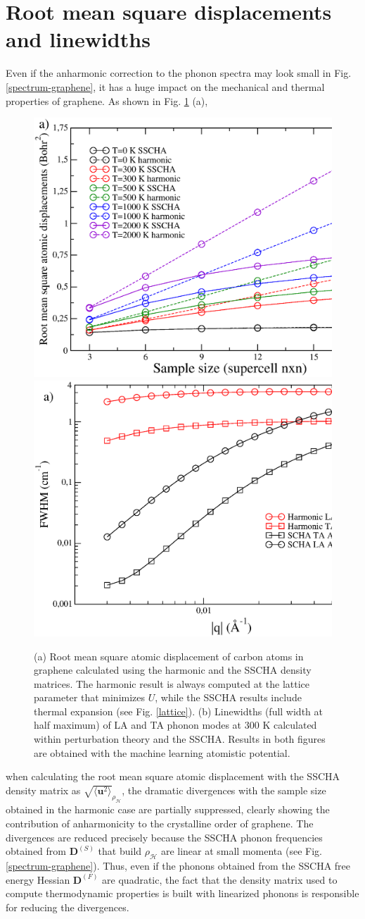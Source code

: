 \section{Root mean square displacements and linewidths}

Even if the anharmonic correction to the phonon spectra may look small in Fig. \ref{spectrum-graphene}, it has a 
huge impact on the mechanical and thermal properties of graphene. As shown in Fig. \ref{problems} (a), 
\begin{figure}[ht]
\includegraphics[width=0.49\linewidth]{Figures/rms.eps}
\includegraphics[width=0.49\linewidth]{Figures/lw-graphene.eps}
\caption[SSCHA root mean square atomic displacements and linewidths]{(a) Root mean square atomic displacement of 
	carbon atoms in graphene calculated using the harmonic and the SSCHA density matrices. The harmonic result 
	is always computed at the lattice parameter that minimizes $U$, while the SSCHA results include thermal 
	expansion (see Fig. \ref{lattice}). (b) Linewidths (full width at half maximum) of LA and TA phonon modes 
	at $300$ K calculated within perturbation theory and the SSCHA. Results in both figures are obtained with 
	the machine learning atomistic potential.}
\label{problems}
\end{figure}
when calculating the root mean square atomic displacement with the SSCHA density matrix as 
$\sqrt{\langle \mathbf{u}^2 \rangle}_{\rho_{\mathcal{H}}}$, the dramatic divergences with the sample size obtained 
in the harmonic case are partially suppressed, clearly showing the contribution of anharmonicity to the crystalline 
order of graphene. The divergences are reduced precisely because the SSCHA phonon frequencies obtained from 
$\boldsymbol{D}^{(S)}$ that build $\rho_{\mathcal{H}}$ are linear at small momenta (see 
Fig. \ref{spectrum-graphene}). Thus, even if the phonons obtained from the SSCHA free energy Hessian 
$\boldsymbol{D}^{(F)}$ are quadratic, the fact that the density matrix used to compute thermodynamic properties is 
built with linearized phonons is responsible for reducing the divergences. \\

